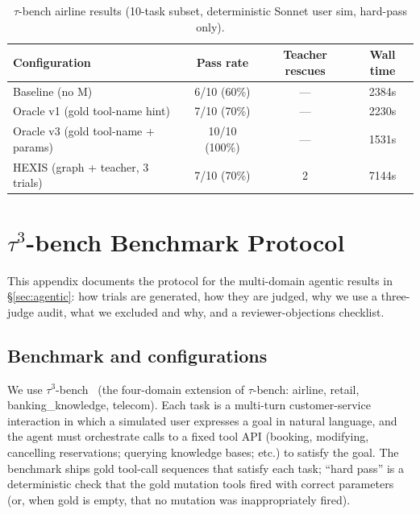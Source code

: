 \begin{table}[!ht]
\centering
\small
\caption{$\tau$-bench airline results (10-task subset, deterministic Sonnet user sim, hard-pass only).}
\label{tab:taubench_airline_canonical}
\begin{tabular}{lccc}
\toprule
\textbf{Configuration} & \textbf{Pass rate} & \textbf{Teacher rescues} & \textbf{Wall time} \\
\midrule
Baseline (no M) & 6/10 (60\%) & --- & 2384s \\
Oracle v1 (gold tool-name hint) & 7/10 (70\%) & --- & 2230s \\
Oracle v3 (gold tool-name + params) & 10/10 (100\%) & --- & 1531s \\
HEXIS (graph + teacher, 3 trials) & 7/10 (70\%) & 2 & 7144s \\
\bottomrule
\end{tabular}
\end{table}

\section{$\tau^3$-bench Benchmark Protocol}
\label{sec:tau3_protocol}

This appendix documents the protocol for the multi-domain agentic results in \S\ref{sec:agentic}: how trials are generated, how they are judged, why we use a three-judge audit, what we excluded and why, and a reviewer-objections checklist.

\subsection{Benchmark and configurations}

We use $\tau^3$-bench~\citep{yao2024tau} (the four-domain extension of $\tau$-bench: airline, retail, banking\_knowledge, telecom). Each task is a multi-turn customer-service interaction in which a simulated user expresses a goal in natural language, and the agent must orchestrate calls to a fixed tool API (booking, modifying, cancelling reservations; querying knowledge bases; etc.) to satisfy the goal. The benchmark ships gold tool-call sequences that satisfy each task; ``hard pass'' is a deterministic check that the gold mutation tools fired with correct parameters (or, when gold is empty, that no mutation was inappropriately fired).

